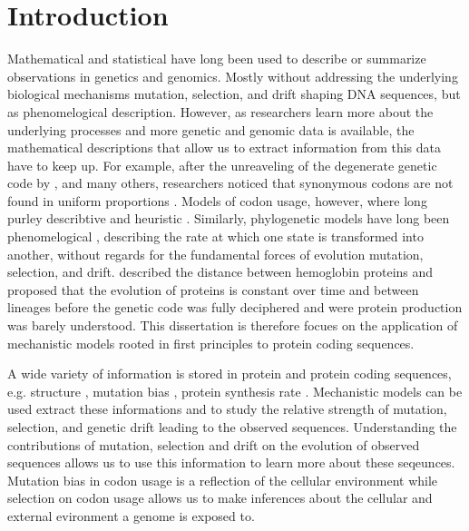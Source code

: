 \chapter{Introduction} 
\label{ch:introduction}

Mathematical and statistical have long been used to describe or summarize observations in genetics and genomics.
Mostly without addressing the underlying biological mechanisms mutation, selection, and drift shaping DNA sequences, but as phenomelogical description.
However, as researchers learn more about the underlying processes and more genetic and genomic data is available, the mathematical descriptions that allow us to extract information from this data have to keep up.
For example, after the unreaveling of the degenerate genetic code by \citet{MatthaeiAndNirenberg1961,NirenbergAndMatthaei1961,Maxwell1962,LederAndNirenberg1964}, and many others, researchers noticed that synonymous codons are not found in uniform proportions \citep{fitch1976,grantham1980,ikemura1981,grantham1981,sharp1988}.
Models of codon usage, however, where long purley describtive and heuristic \citep{ikemura1981,BennetzenAndHall1982,sharp1987,wright1990}.
Similarly, phylogenetic models have long been phenomelogical \citep{JukesAndCantor1969,Dayhoff1978,Kimura1980,felsenstein1981,Altschul1991}, describing the rate at which one state is transformed into another, without regards for the fundamental forces of evolution mutation, selection, and drift.
\citet{ZuckerkandlAndPauling1962} described the distance between hemoglobin proteins and proposed that the evolution of proteins is constant over time and between lineages before the genetic code was fully deciphered and were protein production was barely understood.
This dissertation is therefore focues on the application of mechanistic models rooted in first principles to protein coding sequences.

A wide variety of information is stored in protein and protein coding sequences, e.g. structure \citep{anfinsen1973}, mutation bias \citep{ShahAndGilchrist2011, gilchrist2015}, protein synthesis rate \citep{gilchrist2007,gilchrist2015}. 
Mechanistic models can be used extract these informations and to study the relative strength of mutation, selection, and genetic drift leading to the observed sequences.
Understanding the contributions of mutation, selection and drift on the evolution of observed sequences allows us to use this information to learn more about these seqeunces.
Mutation bias in codon usage is a reflection of the cellular environment while selection on codon usage allows us to make inferences about the cellular and external evironment a genome is exposed to.

